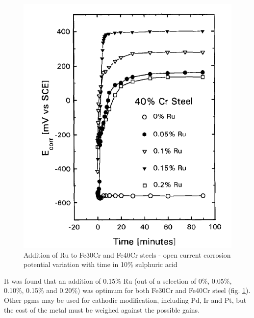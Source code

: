 \begin{figure}
\begin{minipage}{.47\textwidth}
\includegraphics[width=.97\linewidth]{chapters/austenitic_steels_in_nuclear/images/fe40crru.png}
\end{minipage}
\caption{Addition of Ru to Fe30Cr and Fe40Cr steels - open current corrosion potential variation with time in 10\% sulphuric acid\cite{potgieter1994}}
\label{fig:ruadditions}
\end{figure}

It was found that an addition of 0.15\% \Gls{Ru} (out of a selection of 0\%, 0.05\%, 0.10\%, 0.15\% and 0.20\%) was optimum for both Fe30Cr and Fe40Cr steel (fig. \ref{fig:ruadditions})\cite{potgieter1994}.  Other \acrshort{pgm}s may be used for cathodic modification, including \Gls{Pd}, \Gls{Ir} and \Gls{Pt}, but the cost of the metal must be weighed against the possible gains.

